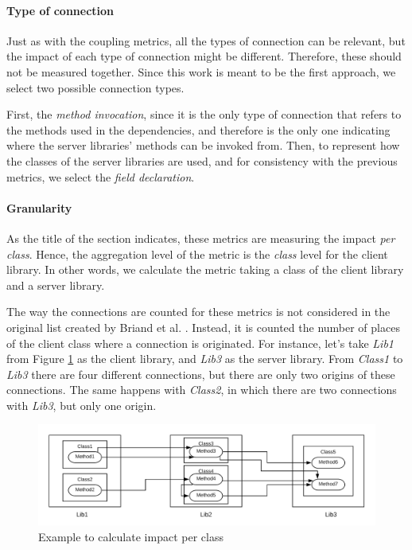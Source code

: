 \paragraph{Type of connection}
Just as with the coupling metrics, all the types of connection can be relevant, but the impact of each type of connection might be different. Therefore, these should not be measured together. Since this work is meant to be the first approach, we select two possible connection types.

First, the \textit{method invocation}, since it is the only type of connection that refers to the methods used in the dependencies, and therefore is the only one indicating where the server libraries' methods can be invoked from. Then, to represent how the classes of the server libraries are used, and for consistency with the previous metrics, we select the \textit{field declaration}.

\paragraph{Granularity}

As the title of the section indicates, these metrics are measuring the impact \textit{per class}. Hence, the aggregation level of the metric is the \textit{class} level for the client library. In other words, we calculate the metric taking a class of the client library and a server library.

The way the connections are counted for these metrics is not considered in the original list created by Briand et al. \cite{briand1999unified}. Instead, it is counted the number of places of the client class where a connection is originated. For instance, let's take \textit{Lib1} from Figure \ref{fig:example-impact-per-class} as the client library, and \textit{Lib3} as the server library. From \textit{Class1} to \textit{Lib3} there are four different connections, but there are only two origins of these connections. The same happens with \textit{Class2}, in which there are two connections with \textit{Lib3}, but only one origin.

\begin{figure}[ht]
\begin{center}
\includegraphics[width=\textwidth]{figures/impact-per-class.png}
\caption{Example to calculate impact per class}
\label{fig:example-impact-per-class}
\end{center}
\end{figure}


